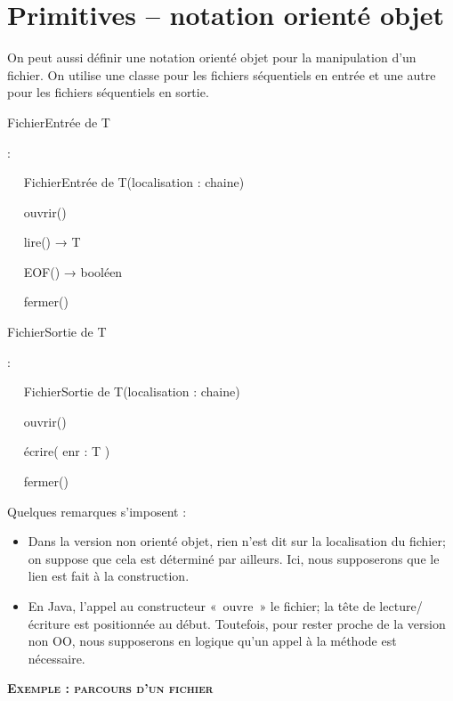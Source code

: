 {\sffamily
{}}

\section{Primitives – notation orienté objet}
{
On peut aussi définir une notation orienté objet pour la manipulation
d'un fichier. On utilise une classe pour les fichiers
séquentiels en entrée et une autre pour les fichiers séquentiels en
sortie.}

{\sffamily
{} FichierEntrée de T}

{\sffamily
{} :}

{\sffamily
\ \  FichierEntrée de T(localisation :
chaine)}

{\sffamily
\ \  ouvrir()}

{\sffamily
\ \  lire() {→} T}

{\sffamily
\ \  EOF() {→} booléen}

{\sffamily
\ \  fermer()}

{\sffamily
{} }


\bigskip

{\sffamily
{} FichierSortie de T}

{\sffamily
{} :}

{\sffamily
\ \  FichierSortie de T(localisation :
chaine)}

{\sffamily
\ \  ouvrir()}

{\sffamily
\ \  écrire( enr : T )}

{\sffamily
\ \  fermer()}

{\sffamily
{}}

{
Quelques remarques s'imposent :}

\liststyleListv
\begin{itemize}
\item {
Dans la version non orienté objet, rien n'est dit sur
la localisation du fichier; on suppose que cela est déterminé par
ailleurs. Ici, nous supposerons que le lien est fait à la
construction.}
\item {
En Java, l'appel au constructeur «~ouvre~» le fichier;
la tête de lecture/écriture est positionnée au début. Toutefois, pour
rester proche de la version non OO, nous supposerons en logique
qu'un appel à la méthode 
est nécessaire.}
\end{itemize}
{\sffamily\bfseries\scshape
Exemple : parcours d'un fichier}

